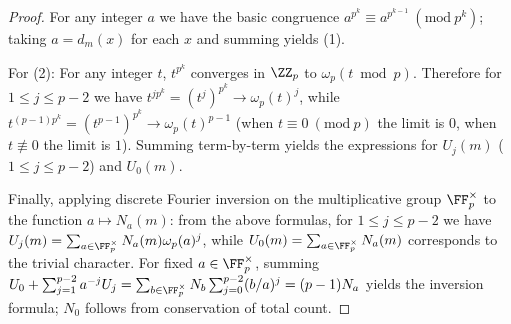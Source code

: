 \begin{proof}
For any integer \(a\) we have the basic congruence \(a^{p^k}\equiv a^{p^{k-1}}\ (\mathrm{mod}\ p^k)\); taking \(a=d_m(x)\) for each \(x\) and summing yields (1).
\par
For (2): For any integer \(t\), \(t^{p^k}\) converges in \(\ZZ_p\) to \(\omega_p(t\bmod p)\).
Therefore for \(1\le j\le p-2\) we have \(t^{j p^k}=(t^j)^{p^k}\to \omega_p(t)^j\), while
\(
t^{(p-1)p^k}=(t^{p-1})^{p^k}\to \omega_p(t)^{p-1}
\)
(when \(t\equiv 0\ (\mathrm{mod}\ p)\) the limit is \(0\), when \(t\not\equiv 0\) the limit is \(1\)).
Summing term-by-term yields the expressions for \(U_j(m)\) (\(1\le j\le p-2\)) and \(U_0(m)\).
\par
Finally, applying discrete Fourier inversion on the multiplicative group \(\FF_p^\times\) to the function \(a\mapsto N_a(m)\): from the above formulas,
for \(1\le j\le p-2\) we have
\(
U_j(m)=\sum_{a\in\FF_p^\times}N_a(m)\omega_p(a)^j
\),
while \(U_0(m)=\sum_{a\in\FF_p^\times}N_a(m)\) corresponds to the trivial character.
For fixed \(a\in\FF_p^\times\), summing
\(
U_0+\sum_{j=1}^{p-2}a^{-j}U_j
=\sum_{b\in\FF_p^\times}N_b\sum_{j=0}^{p-2}(b/a)^j
=(p-1)N_a
\)
yields the inversion formula; \(N_0\) follows from conservation of total count.
\end{proof}

